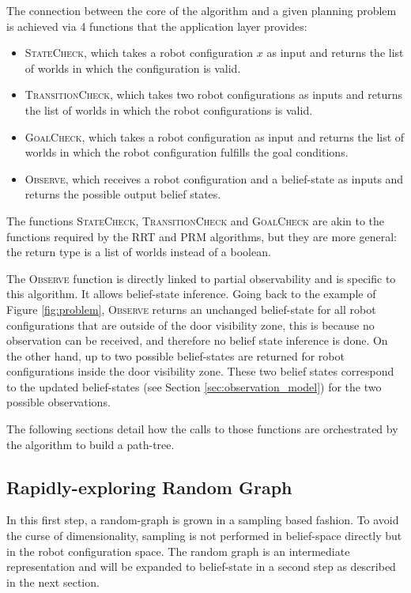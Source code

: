\documentclass[letterpaper, 10 pt, conference]{ieeeconf}  %
\begin{document}
The connection between the core of the algorithm and a given planning problem is achieved via 4 functions that the application layer provides: 
\begin{itemize}
\item \textsc{StateCheck}, which takes a robot configuration $x$ as input and returns the list of worlds in which the configuration is valid.
\item \textsc{TransitionCheck}, which takes two robot configurations as inputs and returns the list of worlds in which the robot configurations is valid.
\item \textsc{GoalCheck}, which takes a robot configuration as input and returns the list of worlds in which the robot configuration fulfills the goal conditions.
\item \textsc{Observe}, which receives a robot configuration and a belief-state as inputs and returns the possible output belief states. %
\end{itemize}

The functions \textsc{StateCheck}, \textsc{TransitionCheck} and \textsc{GoalCheck} are akin to the functions required by the RRT and PRM algorithms, but they are more general: the return type is a list of worlds instead of a boolean.

The \textsc{Observe} function is directly linked to partial observability and is specific to this algorithm. It allows belief-state inference. Going back to the example of Figure \ref{fig:problem}, \textsc{Observe} returns an unchanged belief-state for all robot configurations that are outside of the door visibility zone, this is because no observation can be received, and therefore no belief state inference is done. On the other hand, up to two possible belief-states are returned for robot configurations inside the door visibility zone. These two belief states correspond to the updated belief-states (see Section \ref{sec:observation_model}) for the two possible observations.

The following sections detail how the calls to those functions are orchestrated by the algorithm to build a path-tree.

\subsection{Rapidly-exploring Random Graph}
In this first step, a random-graph is grown in a sampling based fashion. To avoid the curse of dimensionality, sampling is not performed in belief-space directly but in the robot configuration space. The random graph is an intermediate representation and will be expanded to belief-state in a second step as described in the next section.
\end{document}
